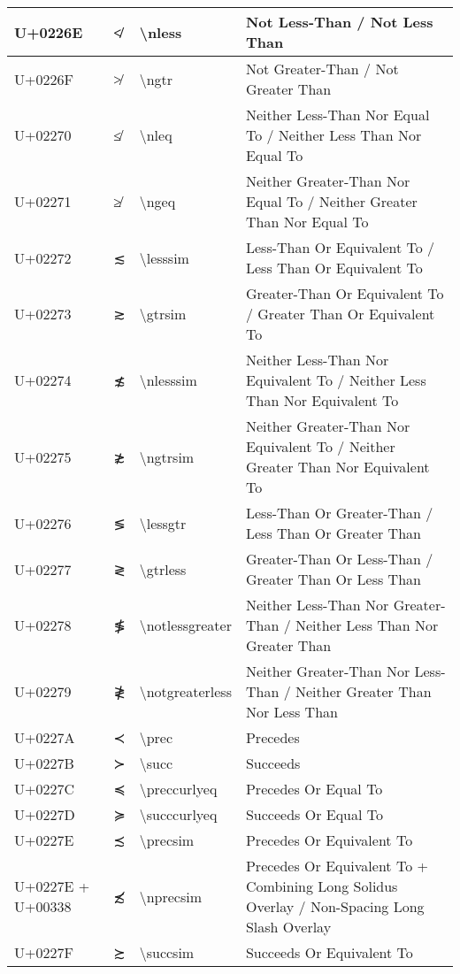 \begin{table}[h]
\begin{tabulary}{\linewidth}{|L|L|L|L|}
\hline
U+0226E & ≮ & {\textbackslash}nless & Not Less-Than / Not Less Than \\
\hline
U+0226F & ≯ & {\textbackslash}ngtr & Not Greater-Than / Not Greater Than \\
\hline
U+02270 & ≰ & {\textbackslash}nleq & Neither Less-Than Nor Equal To / Neither Less Than Nor Equal To \\
\hline
U+02271 & ≱ & {\textbackslash}ngeq & Neither Greater-Than Nor Equal To / Neither Greater Than Nor Equal To \\
\hline
U+02272 & ≲ & {\textbackslash}lesssim & Less-Than Or Equivalent To / Less Than Or Equivalent To \\
\hline
U+02273 & ≳ & {\textbackslash}gtrsim & Greater-Than Or Equivalent To / Greater Than Or Equivalent To \\
\hline
U+02274 & ≴ & {\textbackslash}nlesssim & Neither Less-Than Nor Equivalent To / Neither Less Than Nor Equivalent To \\
\hline
U+02275 & ≵ & {\textbackslash}ngtrsim & Neither Greater-Than Nor Equivalent To / Neither Greater Than Nor Equivalent To \\
\hline
U+02276 & ≶ & {\textbackslash}lessgtr & Less-Than Or Greater-Than / Less Than Or Greater Than \\
\hline
U+02277 & ≷ & {\textbackslash}gtrless & Greater-Than Or Less-Than / Greater Than Or Less Than \\
\hline
U+02278 & ≸ & {\textbackslash}notlessgreater & Neither Less-Than Nor Greater-Than / Neither Less Than Nor Greater Than \\
\hline
U+02279 & ≹ & {\textbackslash}notgreaterless & Neither Greater-Than Nor Less-Than / Neither Greater Than Nor Less Than \\
\hline
U+0227A & ≺ & {\textbackslash}prec & Precedes \\
\hline
U+0227B & ≻ & {\textbackslash}succ & Succeeds \\
\hline
U+0227C & ≼ & {\textbackslash}preccurlyeq & Precedes Or Equal To \\
\hline
U+0227D & ≽ & {\textbackslash}succcurlyeq & Succeeds Or Equal To \\
\hline
U+0227E & ≾ & {\textbackslash}precsim & Precedes Or Equivalent To \\
\hline
U+0227E + U+00338 & ≾̸ & {\textbackslash}nprecsim & Precedes Or Equivalent To + Combining Long Solidus Overlay / Non-Spacing Long Slash Overlay \\
\hline
U+0227F & ≿ & {\textbackslash}succsim & Succeeds Or Equivalent To \\

\end{tabulary}
\end{table}
